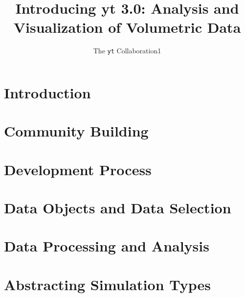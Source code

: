 \documentclass{emulateapj}
\newcommand{\yt}{\texttt{yt}}
\begin{document}
\title{Introducing yt 3.0: Analysis and Visualization of Volumetric Data}
\author{The \yt{} Collaboration{1}}
\email{}

\begin{abstract}
\end{abstract}

\keywords{}


\maketitle


\section{Introduction}


\section{Community Building}


\section{Development Process}


\section{Data Objects and Data Selection}
\label{sec:data_objects}


\section{Data Processing and Analysis}


\section{Abstracting Simulation Types}

\end{document}
